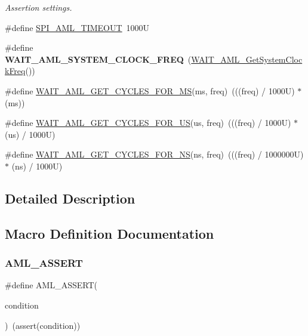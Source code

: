 \begin{DoxyCompactItemize}
\begin{DoxyCompactList}\small\item\em Assertion settings. \end{DoxyCompactList}\item 
\#define \mbox{\hyperlink{group__macro__group_ga8e71a8b01608ee3dcdca398b049e6fc6}{S\+P\+I\+\_\+\+A\+M\+L\+\_\+\+T\+I\+M\+E\+O\+UT}}~1000U
\item 
\mbox{\label{group__macro__group_ga84b004aa110117194411b5c97219f073}} 
\#define {\bfseries W\+A\+I\+T\+\_\+\+A\+M\+L\+\_\+\+S\+Y\+S\+T\+E\+M\+\_\+\+C\+L\+O\+C\+K\+\_\+\+F\+R\+EQ}~(\mbox{\hyperlink{group__function__group_gac2d5cb00bd6e585725d5b1e8f7383302}{W\+A\+I\+T\+\_\+\+A\+M\+L\+\_\+\+Get\+System\+Clock\+Freq}}())
\item 
\#define \mbox{\hyperlink{group__macro__group_ga16504c90d2a4d3b38e4a1c2e6d7836bf}{W\+A\+I\+T\+\_\+\+A\+M\+L\+\_\+\+G\+E\+T\+\_\+\+C\+Y\+C\+L\+E\+S\+\_\+\+F\+O\+R\+\_\+\+MS}}(ms,  freq)~(((freq) / 1000\+U) $\ast$ (ms))
\item 
\#define \mbox{\hyperlink{group__macro__group_gad49b8fcd743fd4f170294d409a8acdee}{W\+A\+I\+T\+\_\+\+A\+M\+L\+\_\+\+G\+E\+T\+\_\+\+C\+Y\+C\+L\+E\+S\+\_\+\+F\+O\+R\+\_\+\+US}}(us,  freq)~(((freq) / 1000\+U) $\ast$ (us) / 1000\+U)
\item 
\#define \mbox{\hyperlink{group__macro__group_ga316e8d701e2fd6dbd036f635d15ac309}{W\+A\+I\+T\+\_\+\+A\+M\+L\+\_\+\+G\+E\+T\+\_\+\+C\+Y\+C\+L\+E\+S\+\_\+\+F\+O\+R\+\_\+\+NS}}(ns,  freq)~(((freq) / 1000000\+U) $\ast$ (ns) / 1000\+U)
\end{DoxyCompactItemize}


\subsection{Detailed Description}


\subsection{Macro Definition Documentation}
\mbox{\label{group__macro__group_gacf378012c67f22a3ce3f8ca5521dd400}} 
\subsubsection{\texorpdfstring{AML\_ASSERT}{AML\_ASSERT}}
{\footnotesize\ttfamily \#define A\+M\+L\+\_\+\+A\+S\+S\+E\+RT(\begin{DoxyParamCaption}\item[{}]{condition }\end{DoxyParamCaption})~(assert(condition))}



